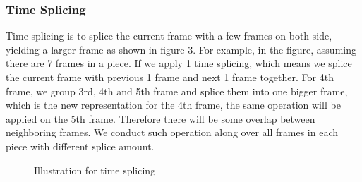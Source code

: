 \documentclass{article}
\begin{document}
\subsubsection{Time Splicing}
Time splicing is to splice the current frame with a few frames on both side, yielding a larger frame as shown in figure 3. For example, in the figure, assuming there are 7 frames in a piece. If we apply 1 time splicing, which means we splice the current frame with previous 1 frame and next 1 frame together. For 4th frame, we group 3rd, 4th and 5th frame and splice them into one bigger frame, which is the new representation for the 4th frame, the same operation will be applied on the 5th frame. Therefore there will be some overlap between neighboring frames. We conduct such operation along over all frames in each piece with different splice amount. 
\begin{figure}
 \centerline{}
 \caption{Illustration for time splicing}
\end{figure}
\end{document}
